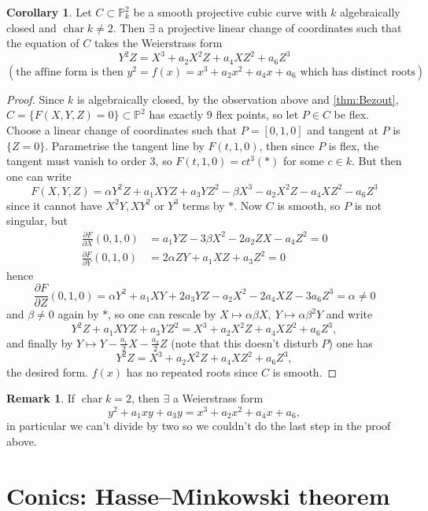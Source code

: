 \documentclass{article}
\newcommand{\p}{\mathbb{P}}
\newcommand{\Char}{\operatorname{char}}
\theoremstyle{definition}
\newtheorem{coro}[defn]{Corollary}
\newtheorem*{remark}{Remark}
\begin{document}
\begin{coro}
\label{coro:Weierstrassform}
Let $C\subset\p^2_k$ be a smooth projective cubic curve with $k$ algebraically closed and $\Char k\neq 2$. Then $\exists$ a projective linear change of coordinates such that the equation of $C$ takes the Weierstrass form
\[
Y^2Z=X^3+a_2X^2Z+a_4XZ^2+a_6Z^3
\]
\[
(\text{the affine form is then }y^2=f(x)=x^3+a_2x^2+a_4x+a_6\text{ which has distinct roots})
\]
\end{coro}
\begin{proof}
Since $k$ is algebraically closed, by the observation above and \ref{thm:Bezout}, $C=\{F(X,Y,Z)=0\}\subset\p^2$ has exactly 9 flex points, so let $P\in C$ be flex. Choose a linear change of coordinates such that $P=[0,1,0]$ and tangent at $P$ is $\{Z=0\}$. Parametrise the tangent line by $F(t,1,0)$, then since $P$ is flex, the tangent must vanish to order 3, so $F(t,1,0)=ct^3 (\ast)$ for some $c\in k$. But then one can write
\[
F(X,Y,Z)=\alpha Y^2Z+a_1XYZ+a_3YZ^2-\beta X^3-a_2X^2Z-a_4XZ^2-a_6Z^3
\]
since it cannot have $X^2Y,XY^2$ or $Y^3$ terms by $\ast$. Now $C$ is smooth, so $P$ is not singular, but
\[
\begin{aligned}
\frac{\partial F}{\partial X}(0,1,0)&=a_1YZ-3\beta X^2-2a_2ZX-a_4Z^2=0 \\
\frac{\partial F}{\partial Y}(0,1,0)&=2\alpha ZY+a_1XZ+a_3Z^2=0
\end{aligned}
\]
hence
\[
\frac{\partial F}{\partial Z}(0,1,0)=\alpha Y^2+a_1 XY+2a_3YZ-a_2X^2-2a_4XZ-3a_6Z^3=\alpha\neq 0
\]
and $\beta\neq 0$ again by $\ast$, so one can rescale by $X\mapsto \alpha\beta X,\ Y\mapsto\alpha\beta^2Y$ and write
\[
Y^2Z+a_1XYZ+a_3YZ^2=X^3+a_2X^2Z+a_4XZ^2+a_6Z^3,
\]
and finally by $Y\mapsto Y-\frac{a_1}{2}X-\frac{a_3}{2}Z$ (note that this doesn't disturb $P$) one has
\[
Y^2Z=X^3+a_2X^2Z+a_4XZ^2+a_6Z^3,
\]
the desired form. $f(x)$ has no repeated roots since $C$ is smooth.
\end{proof}

\begin{remark}
If $\Char k=2$, then $\exists$ a Weierstrass form
\[
y^2+a_1xy+a_3y=x^3+a_2x^2+a_4x+a_6,
\]
in particular we can't divide by two so we couldn't do the last step in the proof above.
\end{remark}

\section{Conics: Hasse--Minkowski theorem}
\end{document}
